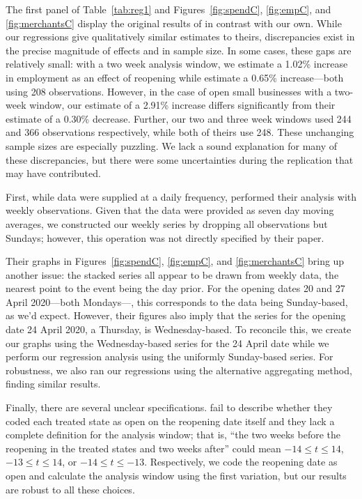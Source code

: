 \documentclass[12pt,letterpaper]{article}
\begin{document}
The first panel of Table~\ref{tab:reg1} and Figures~\ref{fig:spendC}, \ref{fig:empC}, and \ref{fig:merchantsC} display the original results of \citeauthor{Chetty2020} in contrast with our own. While our regressions give qualitatively similar estimates to theirs, discrepancies exist in the precise magnitude of effects and in sample size. In some cases, these gaps are relatively small: with a two week analysis window, we estimate a 1.02\% increase in employment as an effect of reopening while \citeauthor{Chetty2020} estimate a 0.65\% increase---both using 208 observations. However, in the case of open small businesses with a two-week window, our estimate of a 2.91\% increase differs significantly from their estimate of a 0.30\% decrease. Further, our two and three week windows used 244 and 366 observations respectively, while both of theirs use 248. These unchanging sample sizes are especially puzzling. We lack a sound explanation for many of these discrepancies, but there were some uncertainties during the replication that may have contributed.

First, while data were supplied at a daily frequency, \citeauthor{Chetty2020} performed their analysis with weekly observations. Given that the data were provided as seven day moving averages, we constructed our weekly series by dropping all observations but Sundays; however, this operation was not directly specified by their paper. 

Their graphs in Figures~\ref{fig:spendC}, \ref{fig:empC}, and \ref{fig:merchantsC} bring up another issue: the stacked series all appear to be drawn from weekly data, the nearest point to the event being the day prior. For the opening dates 20 and 27 April 2020---both Mondays---, this corresponds to the data being Sunday-based, as we’d expect. However, their figures also imply that the series for the opening date 24 April 2020, a Thursday, is Wednesday-based. To reconcile this, we create our graphs using the Wednesday-based series for the 24 April date while we perform our regression analysis using the uniformly Sunday-based series. For robustness, we also ran our regressions using the alternative aggregating method, finding similar results.

Finally, there are several unclear specifications. \citeauthor{Chetty2020} fail to describe whether they coded each treated state as open on the reopening date itself and they lack a complete definition for the analysis window; that is, “the two weeks before the reopening in the treated states and two weeks after” could mean $-14 \le t \le 14$, $-13 \le t \le14$, or $-14 \le t \le -13$. Respectively, we code the reopening date as open and calculate the analysis window using the first variation, but our results are robust to all these choices.
\end{document}
